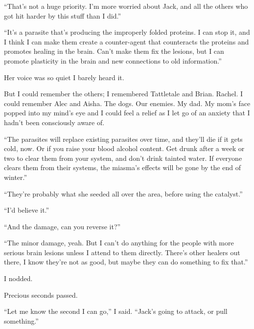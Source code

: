 ``That's not a huge priority.  I'm more worried about Jack, and all the others who got hit harder by this stuff than I did.''



``It's a parasite that's producing the improperly folded proteins.  I can stop it, and I think I can make them create a counter-agent that counteracts the proteins and promotes healing in the brain.  Can't make them fix the lesions, but I can promote plasticity in the brain and new connections to old information.''



Her voice was so quiet I barely heard it.



But I could remember the others; I remembered Tattletale and Brian.  Rachel.  I could remember Alec and Aisha.  The dogs.  Our enemies.  My dad.  My mom's face popped into my mind's eye and I could feel a relief as I let go of an anxiety that I hadn't been consciously aware of.



``The parasites will replace existing parasites over time, and they'll die if it gets cold, now.  Or if you raise your blood alcohol content.  Get drunk after a week or two to clear them from your system, and don't drink tainted water.  If everyone clears them from their systems, the miasma's effects will be gone by the end of winter.''



``They're probably what she seeded all over the area, before using the catalyst.''



``I'd believe it.''



``And the damage, can you reverse it?''



``The minor damage, yeah.  But I can't do anything for the people with more serious brain lesions unless I attend to them directly.  There's other healers out there, I know they're not as good, but maybe they can do something to fix that.''



I nodded.



Precious seconds passed.



``Let me know the second I can go,'' I said.  ``Jack's going to attack, or pull something.''



